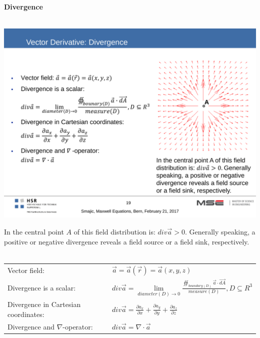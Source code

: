 \textbf{\\ \\ Divergence\\ \\}
\begin{minipage}[lt]{5cm}
	\includegraphics[width=.8\textwidth]{./images/Divergence.pdf}
\end{minipage}
\begin{minipage}[rt]{13cm}
	In the central point $A$ of this field distribution is: $div \vec{a} > 0$. Generally speaking, a positive or negative divergence reveals a field source or a field sink, respectively. \\ \\
	\begin{tabular}{ll}
		Vector field: & $\vec{a} = \vec{a}\left(\vec{r}\right) = \vec{a}\left(x,y,z\right)$\\
		Divergence is a scalar: & $div \vec{a} = \lim\limits_{diameter\left(D\right)\rightarrow 0} \frac{\oiint_{boundary\left(D\right)} \vec{a} \cdot \vec{dA}}{measure\left(D\right)}, D\subseteq R^3$\\
		Divergence in Cartesian coordinates: & $div \vec{a} = \frac{\partial a_x}{\partial x} + \frac{\partial a_y}{\partial y} + \frac{\partial a_z}{\partial z}$\\
		Divergence and $\nabla$-operator: & $div \vec{a} = \nabla \cdot \vec{a}$\\
	\end{tabular}
\end{minipage}

